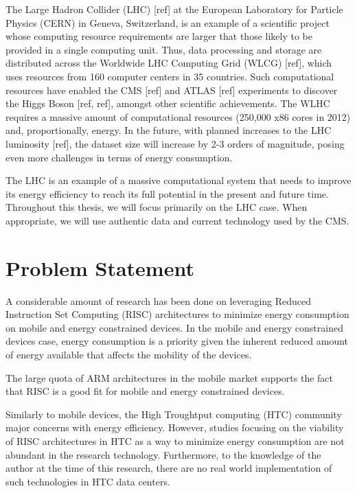 The Large Hadron Collider (LHC) [ref] at the European Laboratory for Particle
Physics (CERN) in Geneva, Switzerland, is an example of a scientific project
whose computing resource requirements are larger that those likely to be provided 
in a single computing unit. Thus, data processing and storage are distributed across 
the Worldwide LHC
Computing Grid (WLCG) [ref], which uses resources from 160 computer centers in 35
countries. Such computational resources have enabled the CMS [ref] and ATLAS [ref]
experiments to discover the Higgs Boson [ref, ref], amongst other scientific 
achievements. 
The WLHC requires a massive amount of computational resources 
(250,000 x86 cores in 2012) and,
proportionally, energy. In the future, with planned increases to the LHC
luminosity [ref], the dataset size will increase by 2-3 orders of magnitude,
posing even more challenges in terms of energy consumption.

The LHC is an example of a massive computational system that needs to improve its
energy efficiency to reach its full potential in the present and future time.
Throughout this thesis, we will focus primarily on the LHC case. When
appropriate, we will use authentic data and current technology used by the CMS.  


\section{Problem Statement}
A considerable amount of research has been done on leveraging Reduced
Instruction Set Computing (RISC) architectures to minimize energy consumption on 
mobile and energy constrained devices. In the mobile and energy constrained devices case, energy consumption is a
priority given the inherent reduced amount of energy available that affects the mobility of the devices. 

The large quota of ARM architectures in the mobile market supports the fact that
RISC is a good fit for mobile and energy constrained devices.


Similarly to mobile devices, the High Troughtput computing (HTC) community major concerns with energy efficiency. However, studies focusing on the viability 
of RISC architectures in HTC as a way to minimize energy consumption are not
abundant in the research technology. Furthermore, to the knowledge of the
author at the time of this research, there are no real world implementation of such technologies in 
HTC data centers.


